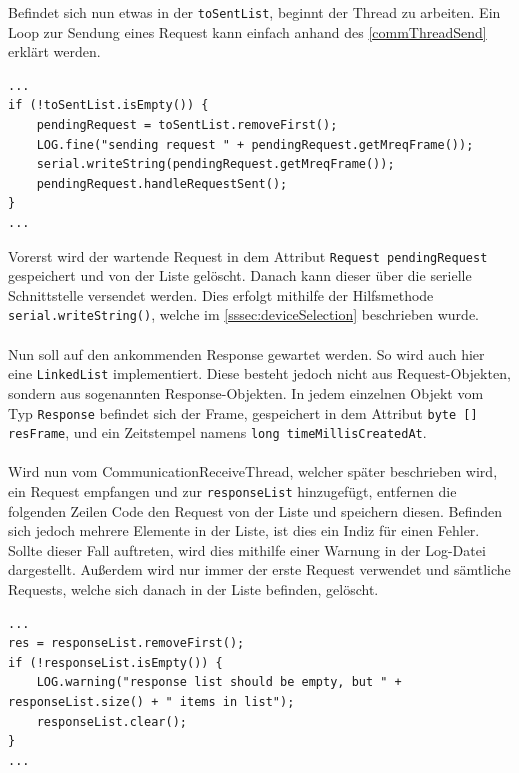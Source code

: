 Befindet sich nun etwas in der \lstinline[style=java]{toSentList}, beginnt der Thread zu arbeiten.
Ein Loop zur Sendung eines Request kann einfach anhand des \autoref{commThreadSend} erklärt werden.
\begin{lstlisting}[style=java,caption=Teilabschnitt CommunicationSendThread,label=commThreadSend]
...
if (!toSentList.isEmpty()) {
    pendingRequest = toSentList.removeFirst();
    LOG.fine("sending request " + pendingRequest.getMreqFrame());
    serial.writeString(pendingRequest.getMreqFrame());
    pendingRequest.handleRequestSent();
}
...
\end{lstlisting}
Vorerst wird der wartende Request in dem Attribut \lstinline[style=java]{Request pendingRequest} gespeichert und von der Liste gelöscht.
Danach kann dieser über die serielle Schnittstelle versendet werden.
Dies erfolgt mithilfe der Hilfsmethode \lstinline[style=java]{serial.writeString()}, welche im \autoref{sssec:deviceSelection} beschrieben wurde.\\\\
Nun soll auf den ankommenden Response gewartet werden.
So wird auch hier eine \lstinline[style=java]{LinkedList} implementiert.
Diese besteht jedoch nicht aus Request-Objekten, sondern aus sogenannten Response-Objekten.
In jedem einzelnen Objekt vom Typ \lstinline[style=java]{Response} befindet sich der Frame, gespeichert in dem Attribut \lstinline[style=java]{byte [] resFrame}, und ein Zeitstempel namens \lstinline[style=java]{long timeMillisCreatedAt}.\\\\
Wird nun vom CommunicationReceiveThread, welcher später beschrieben wird, ein Request empfangen und zur \lstinline[style=java]{responseList} hinzugefügt, entfernen die folgenden Zeilen Code den Request von der Liste und speichern diesen.
Befinden sich jedoch mehrere Elemente in der Liste, ist dies ein Indiz für einen Fehler.
Sollte dieser Fall auftreten, wird dies mithilfe einer Warnung in der Log-Datei dargestellt.
Außerdem wird nur immer der erste Request verwendet und sämtliche Requests, welche sich danach in der Liste befinden, gelöscht.
\begin{lstlisting}[style=java,caption=Teilabschnitt CommunicationSendThread,label=commThreadSend]
...
res = responseList.removeFirst();
if (!responseList.isEmpty()) {
    LOG.warning("response list should be empty, but " + responseList.size() + " items in list");
    responseList.clear();
}
...
\end{lstlisting}
